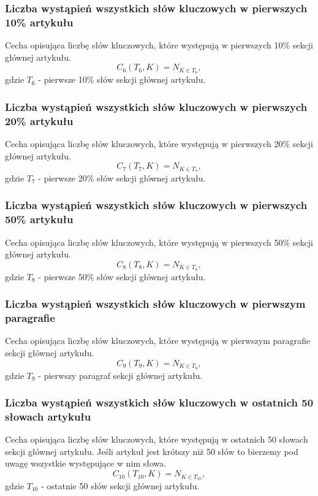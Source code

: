 \documentclass{classrep}
\begin{document}
\subsubsection {Liczba wystąpień wszystkich słów kluczowych w pierwszych 10\% artykułu}
Cecha opisująca liczbę słów kluczowych, które występują w pierwszych 10\% sekcji głównej artykułu.
\begin{equation}
            C_{6}(T_{6},K) = N_{K \in T_{6}},
 \end{equation}	
 gdzie $T_{6}$ - pierwsze 10\% słów sekcji głównej artykułu.

\subsubsection{Liczba wystąpień wszystkich słów kluczowych w pierwszych 20\% artykułu}
Cecha opisująca liczbę słów kluczowych, które występują w pierwszych 20\% sekcji głównej artykułu.
\begin{equation}
            C_{7}(T_{7},K) = N_{K \in T_{7}},
 \end{equation}	
 gdzie $T_{7}$ - pierwsze 20\% słów sekcji głównej artykułu.

\subsubsection{Liczba wystąpień wszystkich słów kluczowych w pierwszych 50\% artykułu}
Cecha opisująca liczbę słów kluczowych, które występują w pierwszych 50\% sekcji głównej artykułu.
\begin{equation}
            C_{8}(T_{8},K) = N_{K \in T_{8}},
 \end{equation}	
 gdzie $T_{8}$ - pierwsze 50\% słów sekcji głównej artykułu.

\subsubsection{Liczba wystąpień wszystkich słów kluczowych w pierwszym paragrafie}
Cecha opisująca liczbę słów kluczowych, które występują w pierwszym paragrafie sekcji głównej artykułu.
\begin{equation}
            C_{9}(T_{9},K) = N_{K \in T_{9}},
 \end{equation}	
 gdzie $T_{9}$ - pierwszy paragraf sekcji głównej artykułu.

\subsubsection{Liczba wystąpień wszystkich słów kluczowych w ostatnich 50 słowach artykułu}
Cecha opisująca liczbę słów kluczowych, które występują w ostatnich 50 słowach sekcji głównej artykułu. Jeśli artykuł jest krótszy niż 50 słów to bierzemy pod uwagę wszystkie występujące w nim słowa.
\begin{equation}
            C_{10}(T_{10},K) = N_{K \in T_{10}},
 \end{equation}	
 gdzie $T_{10}$ - ostatnie 50 słów sekcji głównej artykułu.
\end{document}

